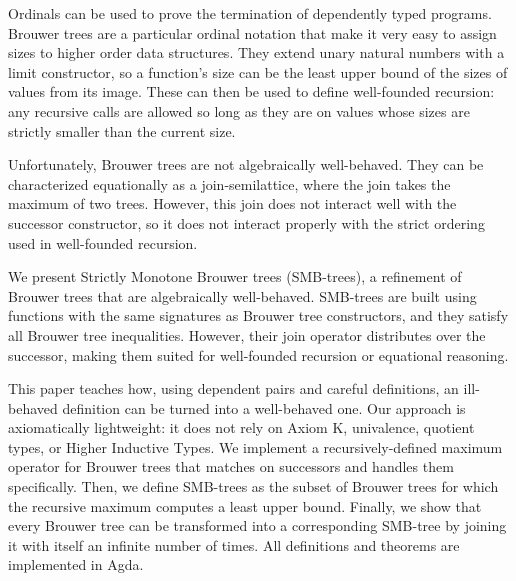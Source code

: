 
Ordinals can be used to prove the termination of dependently typed programs.
Brouwer trees are a particular ordinal notation that
make it very easy to assign sizes to higher order data structures.
They extend unary natural numbers with a limit constructor,
so a function's size can be the least upper bound of the sizes of values from its image.
These can then be used to define well-founded recursion: any recursive calls are allowed
so long as they are on values whose sizes are strictly smaller than the current size.

Unfortunately, Brouwer trees are not algebraically well-behaved.
They can be characterized equationally as a join-semilattice, where the join takes the maximum
of two trees. However, this join does not interact well with
the successor constructor, so it does not interact properly with
the strict ordering used in well-founded recursion.

We present Strictly Monotone Brouwer trees (SMB-trees), a refinement of Brouwer trees
that are algebraically well-behaved. SMB-trees are built using functions with the same
signatures as Brouwer tree constructors, and they satisfy all Brouwer tree inequalities.
However,  their join operator distributes over the successor, making them
suited for well-founded recursion or equational reasoning.

This paper teaches how, using dependent pairs and careful definitions, an ill-behaved
definition can be turned into a well-behaved one.
Our approach is axiomatically lightweight:
it does not rely on Axiom K, univalence, quotient types, or Higher Inductive Types.
We implement a recursively-defined maximum operator for Brouwer trees that matches
on successors and handles them specifically.
Then, we define SMB-trees as the subset of Brouwer trees for which the recursive maximum
computes a least upper bound.
Finally, we show that every Brouwer tree can be transformed into a corresponding SMB-tree
by joining it with itself an infinite number of times.
All definitions and theorems are implemented in Agda.

